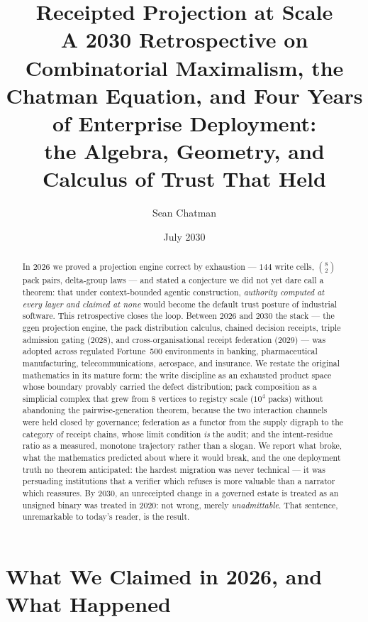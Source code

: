 \documentclass[11pt,a4paper]{report}
\title{\textbf{Receipted Projection at Scale}\\[0.6em]
\large A 2030 Retrospective on Combinatorial Maximalism, the Chatman
Equation, and Four Years of Enterprise Deployment:\\
the Algebra, Geometry, and Calculus of Trust That Held}
\author{Sean Chatman}
\date{July 2030}
\theoremstyle{definition}
\theoremstyle{remark}
\begin{document}
\maketitle

\begin{abstract}
\noindent
In 2026 we proved a projection engine correct by exhaustion --- $144$ write
cells, $\binom{8}{2}$ pack pairs, delta-group laws --- and stated a
conjecture we did not yet dare call a theorem: that under context-bounded
agentic construction, \emph{authority computed at every layer and claimed at
none} would become the default trust posture of industrial software. This
retrospective closes the loop. Between 2026 and 2030 the stack --- the
\textsf{ggen} projection engine, the pack distribution calculus, chained
decision receipts, triple admission gating (2028), and cross-organisational
receipt federation (2029) --- was adopted across regulated Fortune~500
environments in banking, pharmaceutical manufacturing, telecommunications,
aerospace, and insurance. We restate the original mathematics in its mature
form: the write discipline as an exhausted product space whose boundary
provably carried the defect distribution; pack composition as a simplicial
complex that grew from $8$ vertices to registry scale ($10^{4}$ packs)
without abandoning the pairwise-generation theorem, because the two
interaction channels were held closed by governance; federation as a functor
from the supply digraph to the category of receipt chains, whose limit
condition \emph{is} the audit; and the intent-residue ratio as a measured,
monotone trajectory rather than a slogan. We report what broke, what the
mathematics predicted about where it would break, and the one deployment
truth no theorem anticipated: the hardest migration was never technical ---
it was persuading institutions that a verifier which refuses is more
valuable than a narrator which reassures. By 2030, an unreceipted change in
a governed estate is treated as an unsigned binary was treated in 2020:
not wrong, merely \emph{unadmittable}. That sentence, unremarkable to
today's reader, is the result.
\end{abstract}

\tableofcontents

\chapter{What We Claimed in 2026, and What Happened}
\end{document}
